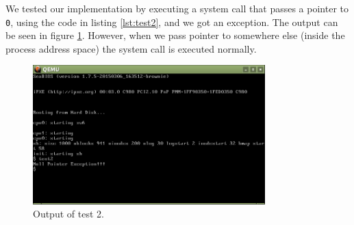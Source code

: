 \documentclass[a4paper,10pt]{scrartcl}
\begin{document}
We tested our implementation by executing a system call that passes a pointer to \texttt{0}, using the code in listing \ref{lst:test2}, and we got an exception. The output can be seen in figure \ref{fig:test2}.  However, when we pass pointer to somewhere else (inside the process address space) the system call is executed normally. 




\begin{figure}
  \centering
  \includegraphics[width=0.8\textwidth]{figures/test2.png}
  \caption{Output of test 2.}\label{fig:test2}
\end{figure}
\end{document}
